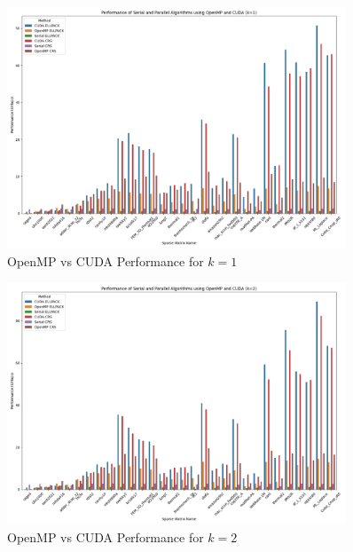 \documentclass[12pt,oneside]{book} %
\begin{document}
\newpage
\begin{figure}[H]
    \centering
    \includegraphics[width=0.9\textwidth]{../results/images/OpenMP_vs_CUDA_Performance_k1.png}
    \caption{OpenMP vs CUDA Performance for $k=1$}
    \label{fig:openmp-cuda-performance-k1}
\end{figure}

\begin{figure}[H]
    \centering
    \includegraphics[width=0.9\textwidth]{../results/images/OpenMP_vs_CUDA_Performance_k2.png}
    \caption{OpenMP vs CUDA Performance for $k=2$}
    \label{fig:openmp-cuda-performance-k2}
\end{figure}
\end{document}
